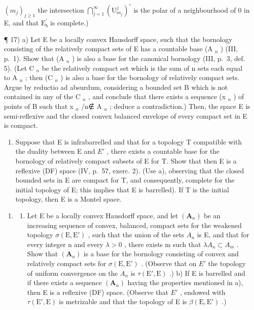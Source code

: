 \((m_{j})_{j\geqslant 1}\) the intersection \(\bigcap_{j = 1}^{\infty}(\mathrm{U}_{m_j}^j)^{\circ}\) is the polar of a neighbourhood of 0 in E, and that \(\mathrm{E}_b^\prime\) is complete.)

¶ 17) a) Let E be a locally convex Hausdorff space, such that the bornology consisting of the relatively compact sets of E has a countable base (A \(_{n}\) ) (III, p.~1). Show that (A \(_{n}\) ) is also a base for the canonical bornology (III, p.~3, def. 5). (Let C \(_{n}\) be the relatively compact set which is the sum of n sets each equal to A \(_{n}\) ; then (C \(_{n}\) ) is also a base for the bornology of relatively compact sets. Argue by reductio ad absurdum, considering a bounded set B which is not contained in any of the C \(_{n}\) , and conclude that there exists a sequence (x \(_{n}\) ) of points of B such that x \(_{n}\) /n∉ A \(_{n}\) ; deduce a contradiction.) Then, the space E is semi-reflexive and the closed convex balanced envelope of every compact set in E is compact.

\begin{enumerate}
\def\labelenumi{\alph{enumi})}
\setcounter{enumi}{1}
\tightlist
\item
  Suppose that E is infrabarrelled and that for a topology T compatible with the duality between E and \(E'\) , there exists a countable base for the bornology of relatively compact subsets of E for T. Show that then E is a reflexive (DF) space (IV, p.~57, exerc. 2). (Use a), observing that the closed bounded sets in E are compact for T, and consequently, complete for the initial topology of E; this implies that E is barrelled). If T is the initial topology, then E is a Montel space.
\end{enumerate}

\begin{enumerate}
\def\labelenumi{\arabic{enumi})}
\setcounter{enumi}{17}
\tightlist
\item
  \begin{enumerate}
  \def\labelenumii{\alph{enumii})}
  \tightlist
  \item
    Let E be a locally convex Hausdorff space, and let \((\mathbf{A}_{n})\) be an increasing sequence of convex, balanced, compact sets for the weakened topology \(\sigma(\mathrm{E}, \mathrm{E}')\) , such that the union of the sets \(A_{n}\) is E, and that for every integer n and every \(\lambda > 0\) , there exists m such that \(\lambda A_{n} \subset A_{m}\) . Show that \((\mathbf{A}_{n})\) is a base for the bornology consisting of convex and relatively compact sets for \(\sigma(\mathrm{E}, \mathrm{E}')\) . (Observe that on \(E'\) the topology of uniform convergence on the \(A_{n}\) is \(\tau(\mathrm{E}', \mathrm{E})\) .) b) If E is barrelled and if there exists a sequence \((\mathbf{A}_{n})\) having the properties mentioned in a), then E is a reflexive (DF) space. (Observe that \(E'\) , endowed with \(\tau(\mathrm{E}', \mathrm{E})\) is metrizable and that the topology of E is \(\beta(\mathrm{E}, \mathrm{E}')\) .)
  \end{enumerate}
\end{enumerate}

